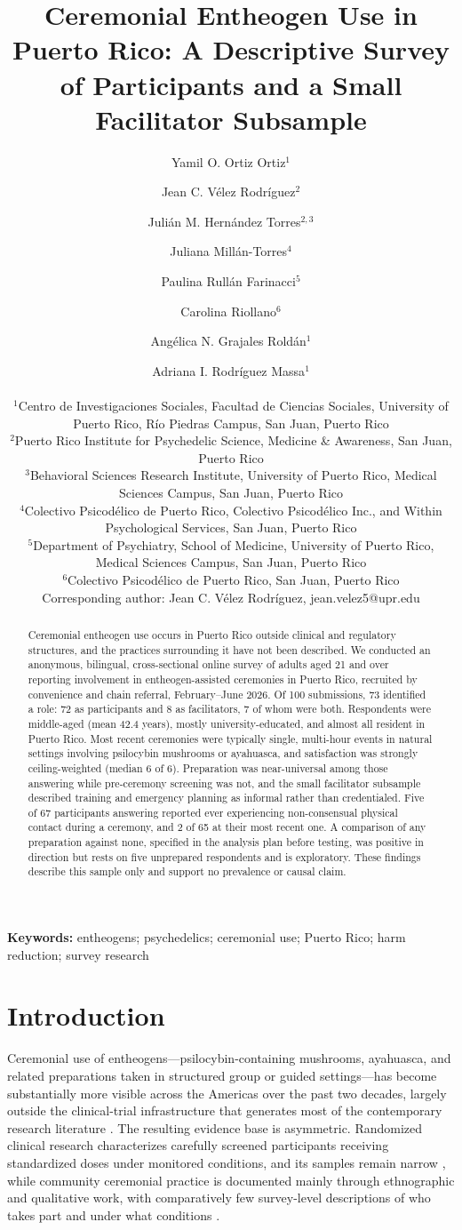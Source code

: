 \documentclass[12pt]{article}
\title{Ceremonial Entheogen Use in Puerto Rico: A Descriptive Survey of Participants
and a Small Facilitator Subsample}
\author{
  Yamil O. Ortiz Ortiz$^{1}$ \and Jean C. V\'elez Rodr\'iguez$^{2}$ \and Juli\'an M. Hern\'andez Torres$^{2,3}$ \and
  Juliana Mill\'an-Torres$^{4}$ \and Paulina Rull\'an Farinacci$^{5}$ \and Carolina Riollano$^{6}$ \and
  Ang\'elica N. Grajales Rold\'an$^{1}$ \and Adriana I. Rodr\'iguez Massa$^{1}$ \\[1em]
  \begin{minipage}{0.92\textwidth}\centering\small\setstretch{1.15}
  $^{1}$Centro de Investigaciones Sociales, Facultad de Ciencias Sociales, University of Puerto Rico,
  R\'io Piedras Campus, San Juan, Puerto Rico \\
  $^{2}$Puerto Rico Institute for Psychedelic Science, Medicine \& Awareness, San Juan, Puerto Rico \\
  $^{3}$Behavioral Sciences Research Institute, University of Puerto Rico, Medical Sciences Campus,
  San Juan, Puerto Rico \\
  $^{4}$Colectivo Psicod\'elico de Puerto Rico, Colectivo Psicod\'elico Inc., and Within Psychological
  Services, San Juan, Puerto Rico \\
  $^{5}$Department of Psychiatry, School of Medicine, University of Puerto Rico, Medical Sciences Campus,
  San Juan, Puerto Rico \\
  $^{6}$Colectivo Psicod\'elico de Puerto Rico, San Juan, Puerto Rico \\[0.5em]
  Corresponding author: Jean C. V\'elez Rodr\'iguez, jean.velez5@upr.edu
  \end{minipage}
}
\date{}
\begin{document}
\maketitle
\linenumbers

\begin{abstract}
\noindent
Ceremonial entheogen use occurs in Puerto Rico outside clinical and regulatory structures, and the
practices surrounding it have not been described. We conducted an anonymous, bilingual, cross-sectional
online survey of adults aged 21 and over reporting involvement in entheogen-assisted ceremonies in Puerto
Rico, recruited by convenience and chain referral, February--June 2026. Of 100 submissions, 73
identified a role: 72 as participants and 8 as facilitators, 7 of whom were both. Respondents were
middle-aged (mean 42.4 years), mostly university-educated, and almost all resident in Puerto Rico. Most
recent ceremonies were typically single, multi-hour events in natural settings involving psilocybin
mushrooms or ayahuasca, and satisfaction was strongly ceiling-weighted (median 6 of 6). Preparation was
near-universal among those answering while pre-ceremony screening was not, and the small facilitator
subsample described training and emergency planning as informal rather than credentialed. Five of 67
participants answering reported ever experiencing non-consensual physical contact during a ceremony, and 2
of 65 at their most recent one. A comparison of any preparation against none, specified in the analysis
plan before testing, was positive in direction but rests on five unprepared respondents and is exploratory.
These findings describe this sample only and support no prevalence or causal claim.
\end{abstract}

\noindent\textbf{Keywords:} entheogens; psychedelics; ceremonial use; Puerto Rico; harm reduction; survey research

\section{Introduction}

Ceremonial use of entheogens---psilocybin-containing mushrooms, ayahuasca, and related preparations taken
in structured group or guided settings---has become substantially more visible across the Americas over the
past two decades, largely outside the clinical-trial infrastructure that generates most of the contemporary
research literature \citep{golden2022effects,carvalho2025scoping}. The resulting evidence base is
asymmetric. Randomized clinical research characterizes carefully screened participants receiving
standardized doses under monitored conditions, and its samples remain narrow
\citep{hughes2024ethnoracial,marcus2026psychedelics}, while community ceremonial practice is documented
mainly through ethnographic and qualitative work, with comparatively few survey-level descriptions of who
takes part and under what conditions \citep{carvalho2025scoping}.
\end{document}

